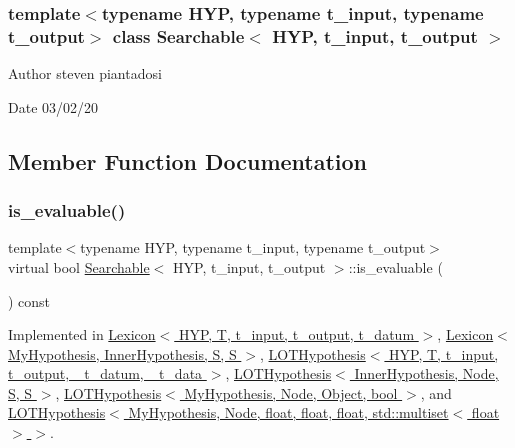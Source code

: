 \subsubsection*{template$<$typename H\+YP, typename t\+\_\+input, typename t\+\_\+output$>$\newline
class Searchable$<$ H\+Y\+P, t\+\_\+input, t\+\_\+output $>$}

\begin{DoxyAuthor}{Author}
steven piantadosi 
\end{DoxyAuthor}
\begin{DoxyDate}{Date}
03/02/20 
\end{DoxyDate}


\subsection{Member Function Documentation}
\mbox{\label{class_searchable_aae16f1cb01f140f4033f6f67dc9753b6}} 
\subsubsection{\texorpdfstring{is\+\_\+evaluable()}{is\_evaluable()}}
{\footnotesize\ttfamily template$<$typename H\+YP, typename t\+\_\+input, typename t\+\_\+output$>$ \\
virtual bool \hyperlink{class_searchable}{Searchable}$<$ H\+YP, t\+\_\+input, t\+\_\+output $>$\+::is\+\_\+evaluable (\begin{DoxyParamCaption}{ }\end{DoxyParamCaption}) const\hspace{0.3cm}{\ttfamily [pure virtual]}}



Implemented in \hyperlink{class_lexicon_ad48a8d79b77aed51caff4d10c7de43a1}{Lexicon$<$ H\+Y\+P, T, t\+\_\+input, t\+\_\+output, t\+\_\+datum $>$}, \hyperlink{class_lexicon_ad48a8d79b77aed51caff4d10c7de43a1}{Lexicon$<$ My\+Hypothesis, Inner\+Hypothesis, S, S $>$}, \hyperlink{class_l_o_t_hypothesis_ad43c57ed606c0f5af6cce0752725f583}{L\+O\+T\+Hypothesis$<$ H\+Y\+P, T, t\+\_\+input, t\+\_\+output, \+\_\+t\+\_\+datum, \+\_\+t\+\_\+data $>$}, \hyperlink{class_l_o_t_hypothesis_ad43c57ed606c0f5af6cce0752725f583}{L\+O\+T\+Hypothesis$<$ Inner\+Hypothesis, Node, S, S $>$}, \hyperlink{class_l_o_t_hypothesis_ad43c57ed606c0f5af6cce0752725f583}{L\+O\+T\+Hypothesis$<$ My\+Hypothesis, Node, Object, bool $>$}, and \hyperlink{class_l_o_t_hypothesis_ad43c57ed606c0f5af6cce0752725f583}{L\+O\+T\+Hypothesis$<$ My\+Hypothesis, Node, float, float, float, std\+::multiset$<$ float $>$ $>$}.

